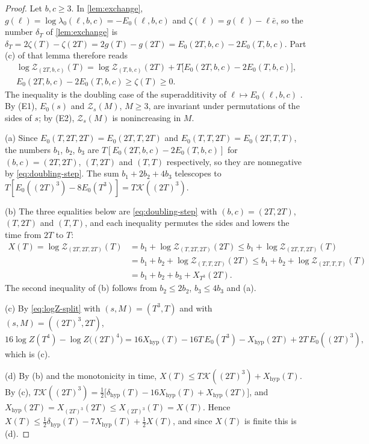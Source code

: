 \documentclass[11pt,a4paper]{amsart}
\theoremstyle{definition}
\theoremstyle{remark}
\numberwithin{equation}{section}
\newcommand{\TT}{\mathbb{T}}               %
\newcommand{\Zc}{\mathcal{Z}}              %
\newcommand{\Zs}[2]{\Zc_{#1}(#2)}          %
\newcommand{\XT}[2]{X_{#1}(#2)}            %
\newcommand{\cube}[1]{(2#1)^3}             %
\newcommand{\lzero}{\lambda_0}             %
\begin{document}
\begin{proof}
Let $b,c\ge3$. In \cref{lem:exchange}, $g(\ell)=\log\lzero(\ell,b,c)=-E_0(\ell,b,c)$ and $\zeta(\ell)=g(\ell)-\ell\bar e$, so the number $\delta_T$ of \cref{lem:exchange} is $\delta_T=2\zeta(T)-\zeta(2T)=2g(T)-g(2T)=E_0(2T,b,c)-2E_0(T,b,c)$. Part (c) of that lemma therefore reads
\begin{equation}\label{eq:doubling-step}
\begin{gathered}
\log\Zs{(2T,b,c)}{T}=\log\Zs{(T,b,c)}{2T}+T\bigl[E_0(2T,b,c)-2E_0(T,b,c)\bigr],\\
E_0(2T,b,c)-2E_0(T,b,c)\ge\zeta(T)\ge0 .
\end{gathered}
\end{equation}
The inequality is the doubling case of the superadditivity of $\ell\mapsto E_0(\ell,b,c)$ \cite[Lemma~28(ii)]{bhattacharjee2026first}. By (E1), $E_0(s)$ and $\Zs{s}{M}$, $M\ge3$, are invariant under permutations of the sides of $s$; by (E2), $\Zs{s}{M}$ is nonincreasing in $M$.

(a) Since $E_0(T,2T,2T)=E_0(2T,T,2T)$ and $E_0(T,T,2T)=E_0(2T,T,T)$, the numbers $b_1$, $b_2$, $b_3$ are $T[E_0(2T,b,c)-2E_0(T,b,c)]$ for $(b,c)=(2T,2T)$, $(T,2T)$ and $(T,T)$ respectively, so they are nonnegative by \eqref{eq:doubling-step}. The sum $b_1+2b_2+4b_3$ telescopes to $T[E_0(\cube{T})-8E_0(T^3)]=T\mathcal K(\cube{T})$.

(b) The three equalities below are \eqref{eq:doubling-step} with $(b,c)=(2T,2T)$, $(T,2T)$ and $(T,T)$, and each inequality permutes the sides and lowers the time from $2T$ to $T$:
\begin{align*}
X(T)=\log\Zs{(2T,2T,2T)}{T}&=b_1+\log\Zs{(T,2T,2T)}{2T}\le b_1+\log\Zs{(2T,T,2T)}{T}\\
&=b_1+b_2+\log\Zs{(T,T,2T)}{2T}\le b_1+b_2+\log\Zs{(2T,T,T)}{T}\\
&=b_1+b_2+b_3+\XT{T^3}{2T}.
\end{align*}
The second inequality of (b) follows from $b_2\le2b_2$, $b_3\le4b_3$ and (a).

(c) By \eqref{eq:logZ-split} with $(s,M)=(T^3,T)$ and with $(s,M)=(\cube{T},2T)$,
\[
16\log Z(T^4)-\log Z\bigl((2T)^4\bigr)=16X_{\mathrm{hyp}}(T)-16T\,E_0(T^3)-X_{\mathrm{hyp}}(2T)+2T\,E_0(\cube{T}),
\]
which is (c).

(d) By (b) and the monotonicity in time, $X(T)\le T\mathcal K(\cube{T})+X_{\mathrm{hyp}}(T)$. By (c), $T\mathcal K(\cube{T})=\frac12\bigl[\delta_{\mathrm{hyp}}(T)-16X_{\mathrm{hyp}}(T)+X_{\mathrm{hyp}}(2T)\bigr]$, and $X_{\mathrm{hyp}}(2T)=\XT{\cube{T}}{2T}\le\XT{\cube{T}}{T}=X(T)$. Hence $X(T)\le\frac12\delta_{\mathrm{hyp}}(T)-7X_{\mathrm{hyp}}(T)+\frac12X(T)$, and since $X(T)$ is finite this is (d).
\end{proof}
\end{document}
